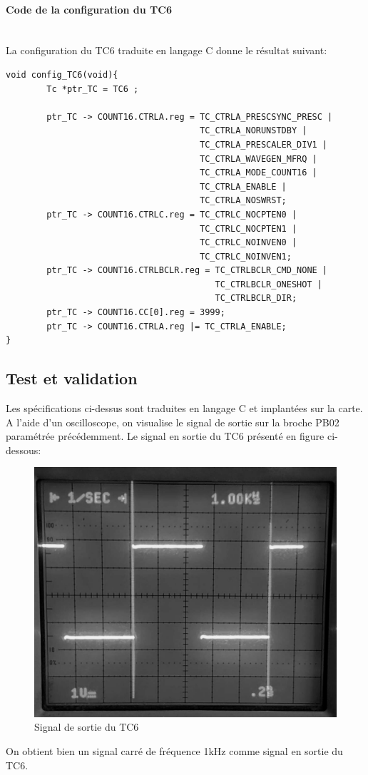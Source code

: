 \documentclass[a4paper]{article}
\begin{document}
	\newpage 
		\paragraph{Code de la configuration du TC6} ~~\\
	La configuration du TC6 traduite en langage C donne le résultat suivant:
	\begin{lstlisting}[style=CStyle]
void config_TC6(void){
	    Tc *ptr_TC = TC6 ;
	
	    ptr_TC -> COUNT16.CTRLA.reg = TC_CTRLA_PRESCSYNC_PRESC |
	                                  TC_CTRLA_NORUNSTDBY |
	                                  TC_CTRLA_PRESCALER_DIV1 |
	                                  TC_CTRLA_WAVEGEN_MFRQ |
	                                  TC_CTRLA_MODE_COUNT16 |
	                                  TC_CTRLA_ENABLE |			
	                                  TC_CTRLA_NOSWRST;
	    ptr_TC -> COUNT16.CTRLC.reg = TC_CTRLC_NOCPTEN0 |
	                                  TC_CTRLC_NOCPTEN1 |
	                                  TC_CTRLC_NOINVEN0 |
	                                  TC_CTRLC_NOINVEN1;
	    ptr_TC -> COUNT16.CTRLBCLR.reg = TC_CTRLBCLR_CMD_NONE |
	                                     TC_CTRLBCLR_ONESHOT |
                                    	 TC_CTRLBCLR_DIR;
    	ptr_TC -> COUNT16.CC[0].reg = 3999;
    	ptr_TC -> COUNT16.CTRLA.reg |= TC_CTRLA_ENABLE;
}
	\end{lstlisting}
	
	\subsection{Test et validation}
	Les spécifications ci-dessus sont traduites en langage C et implantées sur la carte.\\
	A l’aide d’un oscilloscope, on visualise le signal de sortie sur la broche PB02 paramétrée précédemment. Le signal en sortie du TC6 présenté en figure ci-dessous:
	\begin{figure}[H]
		\centering
		\includegraphics[width=0.6\linewidth]{chrono_valide_etape2.jpg}
		\caption{Signal de sortie du TC6}
	\end{figure}
	On obtient bien un signal carré de fréquence 1kHz comme signal en sortie du TC6.
	
\end{document}
